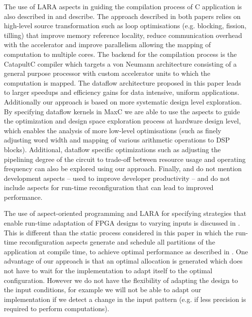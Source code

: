 The use of LARA aspects in guiding the compilation process of C
application is also described in
\cite{Cardoso:Teixeira:Alves:Nobre:Diniz:Cutinho:Luk:2012} and
\cite{cardoso2011new} describe. The approach described in both papers
relies on high-level source transformation such as loop optimisations
(e.g. blocking, fission, tilling) that improve memory reference
locality, reduce communication overhead with the accelerator and
improve parallelism allowing the mapping of computation to multiple
cores. The backend for the compilation process is the CatapultC
\cite{CatapultC} compiler which targets a von Neumann architecture
consisting of a general purpose processor with custom accelerator
units to which the computation is mapped. The dataflow architecture
proposed in this paper leads to larger speedups and efficiency gains
for data intensive, uniform applications. Additionally our approach is
based on more systematic design level exploration. By specifying
dataflow kernels in MaxC we are able to use the aspects to guide the
optimization and design space exploration process at hardware design
level, which enables the analysis of more low-level optimisations
(such as finely adjusting word width and mapping of various arithmetic
operations to DSP blocks). Additional, dataflow specific optimizations
such as adjusting the pipelining degree of the circuit to trade-off
between resource usage and operating frequency can also be explored
using our approach. Finally,
\cite{Cardoso:Teixeira:Alves:Nobre:Diniz:Cutinho:Luk:2012} and
\cite{cardoso2011new} do not mention development aspects -- used to
improve developer productivity -- and do not include aspects for
run-time reconfiguration that can lead to improved performance.

The use of aspect-oriented programming and LARA for specifying
strategies that enable run-time adaptation of FPGA designs to varying
inputs is discussed in \cite{6322875}. This is different than the
static process considered in this paper in which the run-time
reconfiguration aspects generate and schedule all partitions of the
application at compile time, to achieve optimal performance as
described in \cite{Xinyu:Qiwei:Luk:Qiang:Pell:2012}. One advantage of
our approach is that an optimal allocation is generated which does not
have to wait for the implementation to adapt itself to the optimal
configuration. However we do not have the flexibility of adapting the
design to the input conditions, for example we will not be able to
adapt our implementation if we detect a change in the input pattern
(e.g. if less precision is required to perform computations).

